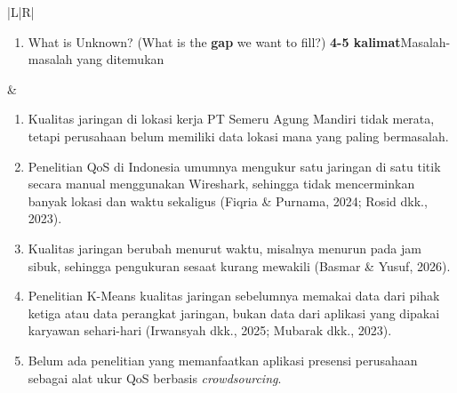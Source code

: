 \documentclass[11pt,a4paper]{article}
\begin{document}
\begin{longtable}{|L|R|}
\begin{enumerate}[label=\arabic*.,start=2]
\item What is Unknown? (What is the \textbf{gap} we want to fill?) \textbf{4-5 kalimat}\newline Masalah-masalah yang ditemukan
\end{enumerate}
&
\begin{enumerate}[label=\arabic*.]
\item Kualitas jaringan di lokasi kerja PT Semeru Agung Mandiri tidak merata, tetapi perusahaan belum memiliki data lokasi mana yang paling bermasalah.
\item Penelitian QoS di Indonesia umumnya mengukur satu jaringan di satu titik secara manual menggunakan Wireshark, sehingga tidak mencerminkan banyak lokasi dan waktu sekaligus (Fiqria \& Purnama, 2024; Rosid dkk., 2023).
\item Kualitas jaringan berubah menurut waktu, misalnya menurun pada jam sibuk, sehingga pengukuran sesaat kurang mewakili (Basmar \& Yusuf, 2026).
\item Penelitian K-Means kualitas jaringan sebelumnya memakai data dari pihak ketiga atau data perangkat jaringan, bukan data dari aplikasi yang dipakai karyawan sehari-hari (Irwansyah dkk., 2025; Mubarak dkk., 2023).
\item Belum ada penelitian yang memanfaatkan aplikasi presensi perusahaan sebagai alat ukur QoS berbasis \textit{crowdsourcing}.
\end{enumerate}
\\ \hline


\end{longtable}
\end{document}
